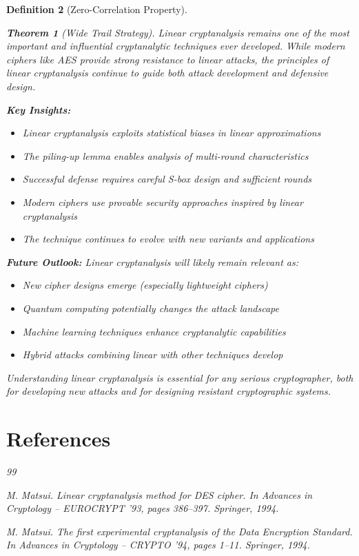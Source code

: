 \documentclass[12pt,a4paper]{article}
\newtheorem{theorem}{Theorem}[section]
\newtheorem{definition}[theorem]{Definition}
\begin{document}
\begin{definition}[Zero-Correlation Property]
\begin{theorem}[Wide Trail Strategy]
Linear cryptanalysis remains one of the most important and influential cryptanalytic techniques ever developed. While modern ciphers like AES provide strong resistance to linear attacks, the principles of linear cryptanalysis continue to guide both attack development and defensive design.

\textbf{Key Insights:}
\begin{itemize}
    \item Linear cryptanalysis exploits statistical biases in linear approximations
    \item The piling-up lemma enables analysis of multi-round characteristics
    \item Successful defense requires careful S-box design and sufficient rounds
    \item Modern ciphers use provable security approaches inspired by linear cryptanalysis
    \item The technique continues to evolve with new variants and applications
\end{itemize}

\textbf{Future Outlook:}
Linear cryptanalysis will likely remain relevant as:
\begin{itemize}
    \item New cipher designs emerge (especially lightweight ciphers)
    \item Quantum computing potentially changes the attack landscape
    \item Machine learning techniques enhance cryptanalytic capabilities
    \item Hybrid attacks combining linear with other techniques develop
\end{itemize}

Understanding linear cryptanalysis is essential for any serious cryptographer, both for developing new attacks and for designing resistant cryptographic systems.

\section{References}

\begin{thebibliography}{99}

M. Matsui.
\newblock Linear cryptanalysis method for DES cipher.
\newblock In \emph{Advances in Cryptology -- EUROCRYPT '93}, pages 386--397. Springer, 1994.

M. Matsui.
\newblock The first experimental cryptanalysis of the Data Encryption Standard.
\newblock In \emph{Advances in Cryptology -- CRYPTO '94}, pages 1--11. Springer, 1994.


\end{thebibliography}
\end{theorem}
\end{definition}
\end{document}
